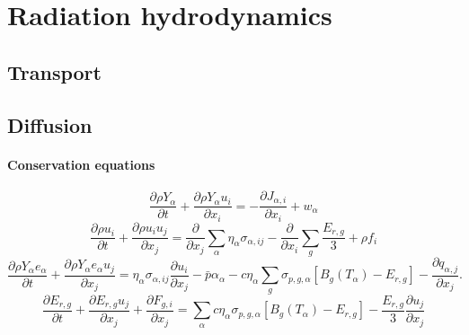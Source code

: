 \documentclass[a4paper,11pt]{article}
\begin{document}
\section{Radiation hydrodynamics}

\subsection{Transport}

\subsection{Diffusion}
\paragraph{Conservation equations}

\begin{equation*}
    \frac{\partial\rho Y_\alpha}{\partial t}+\frac{\partial \rho Y_\alpha u_i}{\partial x_i} = -\frac{\partial J_{\alpha,i}}{\partial x_i} + w_\alpha
\end{equation*}
\begin{equation*}
    \frac{\partial \rho u_i}{\partial t} + \frac{\partial \rho u_i u_j}{\partial x_j} = \frac{\partial}{\partial x_j} \sum_\alpha \eta_\alpha \sigma_{\alpha,ij} - \frac{\partial}{\partial x_i} \sum_g \frac{E_{r,g}}{3} + \rho f_i
\end{equation*}
\begin{equation*}
    \frac{\partial \rho Y_\alpha e_\alpha}{\partial t} + \frac{\partial \rho Y_\alpha e_\alpha u_j}{\partial x_j} = \eta_\alpha \sigma_{\alpha,ij} \frac{\partial u_i}{\partial x_j} - \bar{p} \alpha_\alpha - c \eta_\alpha \sum_g \sigma_{p,g,\alpha} \left[ B_g(T_\alpha) - E_{r,g} \right] - \frac{\partial q_{\alpha,j}}{\partial x_j}.
\end{equation*}
\begin{equation*}
    \frac{\partial E_{r,g}}{\partial t} + \frac{\partial E_{r,g} u_j}{\partial x_j} + \frac{\partial F_{g,i}}{\partial x_j} = \sum_\alpha c \eta_\alpha \sigma_{p,g,\alpha} \left[ B_g(T_\alpha) - E_{r,g} \right] - \frac{E_{r,g}}{3} \frac{\partial u_j}{\partial x_j}
\end{equation*}
\end{document}
